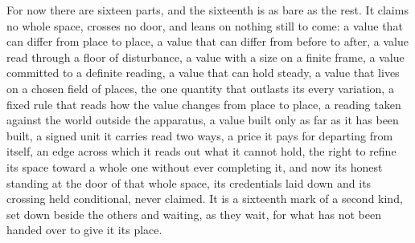 For now there are sixteen parts, and the sixteenth is as bare as the rest. It claims no whole space, crosses no door, and leans on nothing still to come: a value that can differ from place to place, a value that can differ from before to after, a value read through a floor of disturbance, a value with a size on a finite frame, a value committed to a definite reading, a value that can hold steady, a value that lives on a chosen field of places, the one quantity that outlasts its every variation, a fixed rule that reads how the value changes from place to place, a reading taken against the world outside the apparatus, a value built only as far as it has been built, a signed unit it carries read two ways, a price it pays for departing from itself, an edge across which it reads out what it cannot hold, the right to refine its space toward a whole one without ever completing it, and now its honest standing at the door of that whole space, its credentials laid down and its crossing held conditional, never claimed. It is a sixteenth mark of a second kind, set down beside the others and waiting, as they wait, for what has not been handed over to give it its place.
